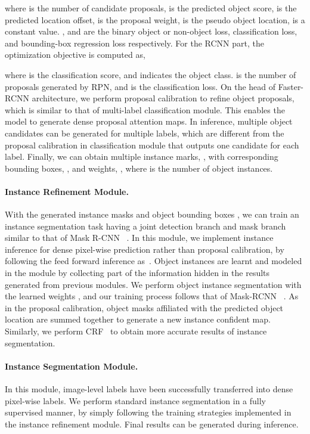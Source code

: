 \documentclass[10pt,twocolumn,letterpaper]{article}
\begin{document}
where  is the number of candidate proposals,  is the predicted object score,  is the predicted location offset,  is the proposal weight,  is the pseudo object location,  is a constant value. ,   and  are the binary object or non-object loss, classification loss, and bounding-box regression loss respectively. For the RCNN part, the optimization objective is computed as,

where  is the classification score, and  indicates the object class.  is the number of proposals generated by RPN, and  is the classification loss.
On the head of Faster-RCNN architecture, we perform proposal calibration to refine object proposals, which is similar to that of  multi-label classification module. This enables the model to generate dense proposal attention maps. In inference, multiple object candidates can be generated for multiple labels, which are different from the proposal calibration in classification module that outputs one candidate for each label. Finally, we can obtain multiple instance marks, , with corresponding bounding boxes, , and weights, , where  is the number of object instances.


\vspace{-3mm}

\paragraph{Instance Refinement Module.} With the generated instance masks  and object bounding boxes , we can train an instance segmentation task having a joint detection branch and mask branch similar to that of Mask R-CNN ~\cite{he2017mask}. In this module, we implement instance inference for dense pixel-wise prediction rather than proposal calibration, by following the feed forward inference as~\cite{he2017mask}.
Object instances are learnt and modeled in the module by collecting part of the information hidden in the results generated from previous modules. We perform object instance segmentation with the learned weights , and our training process follows that of Mask-RCNN ~\cite{he2017mask}.
As in the proposal calibration, object masks affiliated with the predicted object location are summed together to generate a new instance confident map. Similarly, we perform CRF~\cite{krahenbuhl2011efficient} to obtain more accurate results of instance segmentation.
\vspace{-3mm}

\paragraph{Instance Segmentation Module.} In this module, image-level labels have been successfully transferred into dense pixel-wise labels. We perform standard instance segmentation in a fully supervised manner, by simply following the training strategies implemented in the instance refinement module. Final results can be generated during inference.
\end{document}

